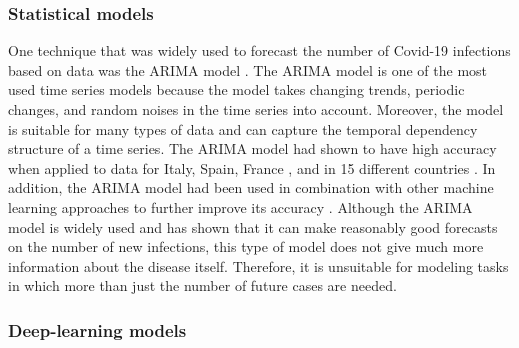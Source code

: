 \subsubsection{Statistical models}

One technique that was widely used to forecast the number of Covid-19 infections based on data was the \gls{ARIMA} model \cite{box2015time}.
The \gls{ARIMA} model is one of the most used time series models because the model takes changing trends, periodic changes, and random noises in the time series into account.
Moreover, the model is suitable for many types of data and can capture the temporal dependency structure of a time series.
The \gls{ARIMA} model had shown to have high accuracy when applied to data for Italy, Spain, France \cite{ceylanEstimationCOVID19Prevalence2020}, and in 15 different countries \cite{singhPredictionCOVID19Pandemic2020}.
In addition, the \gls{ARIMA} model had been used in combination with other machine learning approaches to further improve its accuracy \cite{ribeiroShorttermForecastingCOVID192020}.
Although the \gls{ARIMA} model is widely used and has shown that it can make reasonably good forecasts on the number of new infections, this type of model does not give much more information about the disease itself.
Therefore, it is unsuitable for modeling tasks in which more than just the number of future cases are needed.

\subsubsection{Deep-learning models}


